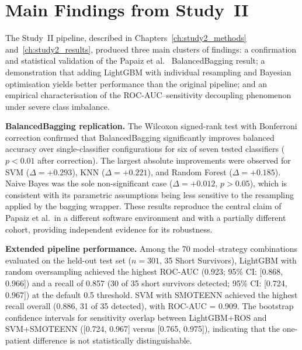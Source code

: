 \section{Main Findings from Study~II}
\label{sec:conclusion_study2}

The Study~II pipeline, described in Chapters~\ref{ch:study2_methods} and~\ref{ch:study2_results}, produced three main clusters of findings: a confirmation and statistical validation of the Papaiz et al.\ \cite{Papaiz2024} BalancedBagging result; a demonstration that adding LightGBM with individual resampling and Bayesian optimisation yields better performance than the original pipeline; and an empirical characterisation of the \gls{ROC-AUC}--sensitivity decoupling phenomenon under severe class imbalance.

\textbf{BalancedBagging replication.} The Wilcoxon signed-rank test with Bonferroni correction confirmed that BalancedBagging significantly improves balanced accuracy over single-classifier configurations for six of seven tested classifiers ($p < 0.01$ after correction). The largest absolute improvements were observed for \gls{SVM} ($\Delta = +0.293$), KNN ($\Delta = +0.221$), and Random Forest ($\Delta = +0.185$). Naive Bayes was the sole non-significant case ($\Delta = +0.012$, $p > 0.05$), which is consistent with its parametric assumptions being less sensitive to the resampling applied by the bagging wrapper. These results reproduce the central claim of Papaiz et al.\ in a different software environment and with a partially different cohort, providing independent evidence for its robustness.

\textbf{Extended pipeline performance.} Among the 70 model--strategy combinations evaluated on the held-out test set ($n = 301$, 35 Short Survivors), LightGBM with random oversampling achieved the highest \gls{ROC-AUC} (0.923; 95\% \gls{CI}: [0.868, 0.966]) and a recall of 0.857 (30 of 35 short survivors detected; 95\% \gls{CI}: [0.724, 0.967]) at the default 0.5 threshold. \gls{SVM} with SMOTEENN achieved the highest recall overall (0.886, 31 of 35 detected), with \gls{ROC-AUC} = 0.909. The bootstrap confidence intervals for sensitivity overlap between LightGBM+ROS and SVM+SMOTEENN ([0.724, 0.967] versus [0.765, 0.975]), indicating that the one-patient difference is not statistically distinguishable.

